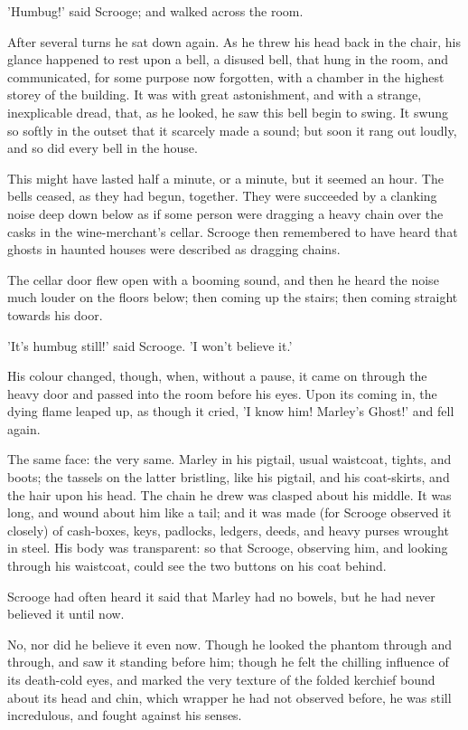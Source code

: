 'Humbug!' said Scrooge; and walked across the room.

After several turns he sat down again. As he threw his head back in the
chair, his glance happened to rest upon a bell, a disused bell, that
hung in the room, and communicated, for some purpose now forgotten, with
a chamber in the highest storey of the building. It was with great
astonishment, and with a strange, inexplicable dread, that, as he
looked, he saw this bell begin to swing. It swung so softly in the
outset that it scarcely made a sound; but soon it rang out loudly, and
so did every bell in the house.

This might have lasted half a minute, or a minute, but it seemed an
hour. The bells ceased, as they had begun, together. They were succeeded
by a clanking noise deep down below as if some person were dragging a
heavy chain over the casks in the wine-merchant's cellar. Scrooge then
remembered to have heard that ghosts in haunted houses were described as
dragging chains.

The cellar door flew open with a booming sound, and then he heard the
noise much louder on the floors below; then coming up the stairs; then
coming straight towards his door.

'It's humbug still!' said Scrooge. 'I won't believe it.'

His colour changed, though, when, without a pause, it came on through
the heavy door and passed into the room before his eyes. Upon its coming
in, the dying flame leaped up, as though it cried, 'I know him! Marley's
Ghost!' and fell again.

The same face: the very same. Marley in his pigtail, usual waistcoat,
tights, and boots; the tassels on the latter bristling, like his
pigtail, and his coat-skirts, and the hair upon his head. The chain he
drew was clasped about his middle. It was long, and wound about him like
a tail; and it was made (for Scrooge observed it closely) of cash-boxes,
keys, padlocks, ledgers, deeds, and heavy purses wrought in steel. His
body was transparent: so that Scrooge, observing him, and looking
through his waistcoat, could see the two buttons on his coat behind.

Scrooge had often heard it said that Marley had no bowels, but he had
never believed it until now.

No, nor did he believe it even now. Though he looked the phantom through
and through, and saw it standing before him; though he felt the chilling
influence of its death-cold eyes, and marked the very texture of the
folded kerchief bound about its head and chin, which wrapper he had not
observed before, he was still incredulous, and fought against his
senses.

